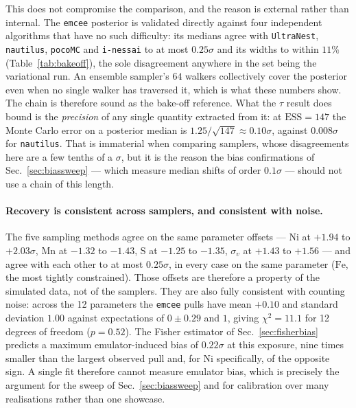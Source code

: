 \documentclass[11pt,a4paper]{article}
\newcommand{\code}[1]{\texttt{#1}}
\begin{document}
This does not compromise the comparison, and the reason is external rather than
internal. The \code{emcee} posterior is validated directly against four
independent algorithms that have no such difficulty: its medians agree with
\code{UltraNest}, \code{nautilus}, \code{pocoMC} and \code{i-nessai} to at most
$0.25\sigma$ and its widths to within $11\%$ (Table~\ref{tab:bakeoff}), the
sole disagreement anywhere in the set being the variational run. An ensemble
sampler's $64$ walkers collectively cover the posterior even when no single
walker has traversed it, which is what these numbers show. The chain is
therefore sound as the bake-off reference. What the $\tau$ result does bound is
the \emph{precision} of any single quantity extracted from it: at
$\mathrm{ESS}=147$ the Monte Carlo error on a posterior median is
$1.25/\sqrt{147}\approx0.10\sigma$, against $0.008\sigma$ for \code{nautilus}.
That is immaterial when comparing samplers, whose disagreements here are a few
tenths of a $\sigma$, but it is the reason the bias confirmations of
Sec.~\ref{sec:biassweep} --- which measure median shifts of order $0.1\sigma$
--- should not use a chain of this length.

\paragraph{Recovery is consistent across samplers, and consistent with noise.}
The five sampling methods agree on the same parameter offsets --- $\mathrm{Ni}$
at $+1.94$ to $+2.03\sigma$, $\mathrm{Mn}$ at $-1.32$ to $-1.43$,
$\mathrm{S}$ at $-1.25$ to $-1.35$, $\sigma_v$ at $+1.43$ to $+1.56$ --- and
agree with each other to at most $0.25\sigma$, in every case on the same
parameter ($\mathrm{Fe}$, the most tightly constrained). Those offsets are
therefore a property of the simulated data, not of the samplers. They are also
fully consistent with counting noise: across the 12 parameters the \code{emcee}
pulls have mean $+0.10$ and standard deviation $1.00$ against expectations of
$0\pm0.29$ and $1$, giving $\chi^{2}=11.1$ for 12 degrees of freedom
($p=0.52$). The Fisher estimator of Sec.~\ref{sec:fisherbias} predicts a maximum
emulator-induced bias of $0.22\sigma$ at this exposure, nine times smaller than
the largest observed pull and, for $\mathrm{Ni}$ specifically, of the opposite
sign. A single fit therefore cannot measure emulator bias, which is precisely
the argument for the sweep of Sec.~\ref{sec:biassweep} and for calibration over
many realisations rather than one showcase.
\end{document}
